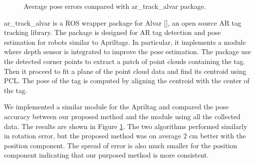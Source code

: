 \begin{figure}
\centering
{}
\caption{Average pose errors compared with ar\_track\_alvar package.}
\label{fig:alvartrack}
\end{figure}

ar\_track\_alvar is a ROS wrapper package for Alvar [], an open source AR tag tracking library. The package is designed for AR tag detection and pose estimation for robots similar to Apriltags. In particular, it implements a module where depth sensor is integrated to improve the pose estimation. The package use the detected corner points to extract a patch of point clouds containing the tag. Then it proceed to fit a plane of the point cloud data and find its centroid using PCL. The pose of the tag is computed by aligning the centroid with the center of the tag.   

We implemented a similar module for the Apriltag and compared the pose accuracy between our proposed method and the module using all the collected data. The results are shown in Figure \ref{fig:alvartrack}. The two algorithms performed similarly in rotation error, but the proposed method was on average $2$ cm better with the position component. The spread of error is also much smaller for the position component indicating that our purposed method is more consistent.

